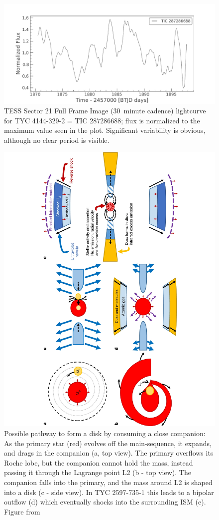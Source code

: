 \documentclass[letterpaper,11pt]{article}
\begin{document}
\begin{figure}
\includegraphics[width=.7\textwidth]{TESSlc}
\caption{TESS Sector 21 Full Frame Image (30~minute cadence) lightcurve for TYC 4144-329-2 = TIC 287286688;
               flux is normalized to the maximum value seen in the plot. Significant variability is obvious, although no clear period is visible.}
\label{fig:TESS}
\end{figure}


\begin{figure}[htbp]
\begin{center}
\includegraphics[angle=-90,width=.7\textwidth]{nature_sketch}
\caption{Possible pathway to form a disk by consuming a close companion: As the primary star (red) evolves off the main-sequence, it expands, and drags in the companion (a, top view). The primary overflows its Roche lobe, but the companion cannot hold the mass, instead passing it through the Lagrange point L2 (b - top view). The companion falls into the primary, and the mass around L2 is shaped into a disk (c - side view). In TYC 2597-735-1 this leads to a bipolar outflow (d) which eventually shocks into the surrounding ISM (e). Figure from \cite{2020Natur.587..387H}}
\label{fig:naturesketch}
\end{center}
\end{figure}
\end{document}
